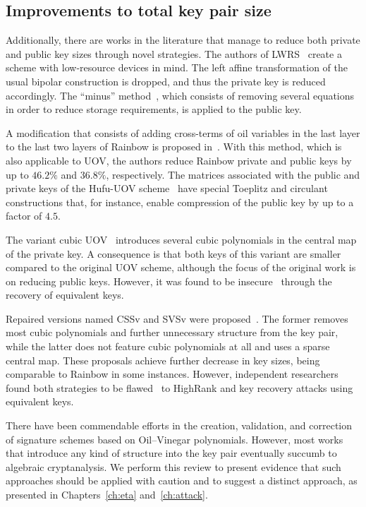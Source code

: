 \documentclass[english]{ufsc-thesis-rn46-2019/ufsc-thesis-rn46-2019}
\theoremstyle{definition}
\begin{document}
\subsection{Improvements to total key pair size}\label{subsec:both}

Additionally, there are works in the literature that manage to reduce both
private and public key sizes through novel strategies. The authors of
LWRS~\cite{Zhang:201208} create a scheme with low-resource devices in mind. The
left affine transformation of the usual bipolar construction is dropped, and
thus the private key is reduced accordingly. The ``minus''
method~\cite[Sec.~3.2.1]{Wolf:200511}, which consists of removing several
equations in order to reduce storage requirements, is applied to the public
key.

A modification that consists of adding cross-terms of oil variables in the last
layer to the last two layers of Rainbow is proposed in~\cite{Tan:201603}. With
this method, which is also applicable to UOV, the authors reduce Rainbow
private and public keys by up to $46.2\%$ and $36.8\%$, respectively. The
matrices associated with the public and private keys of the Hufu-UOV
scheme~\cite{Tao:201905} have special Toeplitz and circulant constructions
that, for instance, enable compression of the public key by up to a factor of
$4.5$.

The variant cubic UOV~\cite{Nie:201511} introduces several cubic polynomials in
the central map of the private key. A consequence is that both keys of this
variant are smaller compared to the original UOV scheme, although the focus of
the original work is on reducing public keys. However, it was found to be
insecure~\cite{Hashimoto:201712} through the recovery of equivalent keys.

Repaired versions named CSSv and SVSv were proposed~\cite{Duong:201611}. The
former removes most cubic polynomials and further unnecessary structure from
the key pair, while the latter does not feature cubic polynomials at all and
uses a sparse central map. These proposals achieve further decrease in key
sizes, being comparable to Rainbow in some instances. However, independent
researchers found both strategies to be
flawed~\cite{Shim:201711,Hashimoto:201712} to HighRank and key recovery attacks
using equivalent keys.

There have been commendable efforts in the creation, validation, and correction
of signature schemes based on Oil--Vinegar polynomials. However, most works
that introduce any kind of structure into the key pair eventually succumb to
algebraic cryptanalysis. We perform this review to present evidence that such
approaches should be applied with caution and to suggest a distinct approach,
as presented in Chapters~\ref{ch:eta} and~\ref{ch:attack}.
\end{document}
